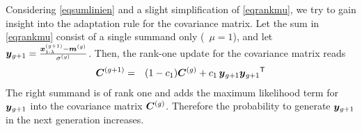 \documentclass{article} %
\newcommand{\kom}[1]{}
\newcommand{\ve}[1]{\mathchoice{\mbox{\boldmath$\displaystyle#1$}}
  {\mbox{\boldmath$\textstyle#1$}} {\mbox{\boldmath$\scriptstyle#1$}}
  {\mbox{\boldmath$\scriptscriptstyle#1$}}}
\newcommand{\ma}[1]{\mathchoice{\mbox{\boldmath$\displaystyle#1$}}
  {\mbox{\boldmath$\textstyle#1$}} {\mbox{\boldmath$\scriptstyle#1$}}
  {\mbox{\boldmath$\scriptscriptstyle#1$}}}
\newcommand{\T}{\ensuremath{\mathsf{T}}}
\newcommand{\lam}{\ensuremath{\lambda}}
\newcommand{\sigg}{\sigma^{(g)}}
\newcommand{\Cg}{\ensuremath{\ma{C}^{(g)}}}
\newcommand{\Cgg}{\ma{C}^{(g+1)}}
\newcommand{\xgg}{\ve{x}^{(g+1)}}
\newcommand{\cone}{\ensuremath{c_1}}
\newcommand{\xmean}{\ensuremath{\ve{m}}}
\newcommand{\xmeang}{\ensuremath{\xmean^{(g)}}}
\begin{document}
 Considering \eqref{eqsumlinien} and a slight simplification of
 \eqref{eqrankmu}, we try to gain insight into the adaptation rule for
 the covariance matrix. Let the sum in \eqref{eqrankmu} consist of a
 single summand only (\eg\ $\mu=1$), and let $\ve{y}_{g+1} =
 \frac{\xgg_{1:\lam} - \xmeang}{\sigg}$.  Then, the rank-one update for the
 covariance matrix reads
\begin{eqnarray}
  \Cgg &=& (1-\cone)\Cg + \cone \,{\ve{y}_{g+1}} {\ve{y}_{g+1}}^\T
       \label{eqrankonesimp}
\end{eqnarray}
%
 The right summand is of rank one and adds the maximum likelihood term
 for $\ve{y}_{g+1}$ into the covariance matrix $\Cg$. Therefore the
 probability to generate $\ve{y}_{g+1}$ in the next generation
 increases.\kom{%
%
   We believe that $\Cgg$ achieves maximum likelihood for
   $\ve{y}_{g+1}$, given the prior $\Cg$ and zero mean, but the exact
   conditions have yet to been shown. }
%
\end{document}
